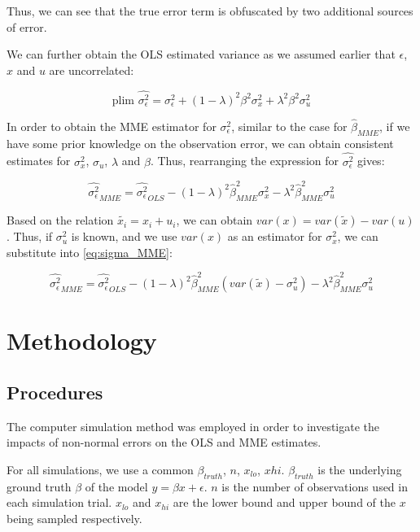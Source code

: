 \documentclass{article}
\begin{document}
Thus, we can see that the true error term is obfuscated by two additional sources of error. 

We can further obtain the OLS estimated variance as we assumed earlier that $\epsilon$, $x$ and $u$ are uncorrelated:

\begin{equation}
    \textrm{plim } \hat{\sigma^2_\epsilon} = \sigma_\epsilon^2 + (1-\lambda)^2 \beta^2 \sigma_x^2 + \lambda^2 \beta^2 \sigma_u^2   
\end{equation}

In order to obtain the MME estimator for $\sigma^2_\epsilon$, similar to the case for $\hat{\beta}_{MME}$, if we have some prior knowledge on the observation error, we can obtain consistent estimates for $\sigma_x^2$, $\sigma_u$, $\lambda$ and $\beta$.
Thus, rearranging the expression for $\hat{\sigma^2_\epsilon}$ gives:

\begin{equation}
    \label{eq:sigma_MME}
    \hat{\sigma_\epsilon^2}_{MME} = \hat{\sigma^2_\epsilon}_{OLS} -  (1-\lambda)^2 \hat{\beta}_{MME}^2 \sigma_x^2 - \lambda^2 \hat{\beta}_{MME}^2 \sigma_u^2   
\end{equation}

Based on the relation $\tilde{x_i} = x_i + u_i$, we can obtain $var(x) = var(\tilde{x}) - var(u)$.
Thus, if $\sigma^2_u$ is known, and we use $var(x)$ as an estimator for $\sigma^2_x$, we can substitute into \ref{eq:sigma_MME}:

\begin{equation}
    \hat{\sigma_\epsilon^2}_{MME} = \hat{\sigma^2_\epsilon}_{OLS} -  (1-\lambda)^2 \hat{\beta}_{MME}^2 (var(\tilde{x}) - \sigma^2_u) - \lambda^2 \hat{\beta}_{MME}^2 \sigma_u^2
\end{equation}

\section{Methodology}

\subsection{Procedures}

The computer simulation method was employed in order to investigate the impacts of non-normal errors on the OLS and MME estimates.

For all simulations, we use a common $\beta_{truth}$, $n$, $x_{lo}$, $x{hi}$. $\beta_{truth}$ is the underlying ground truth $\beta$ of the model $y=\beta x + \epsilon$. $n$ is the number of observations used in each simulation trial. $x_{lo}$ and $x_{hi}$ are the lower bound and upper bound of the $x$ being sampled respectively.
\end{document}
